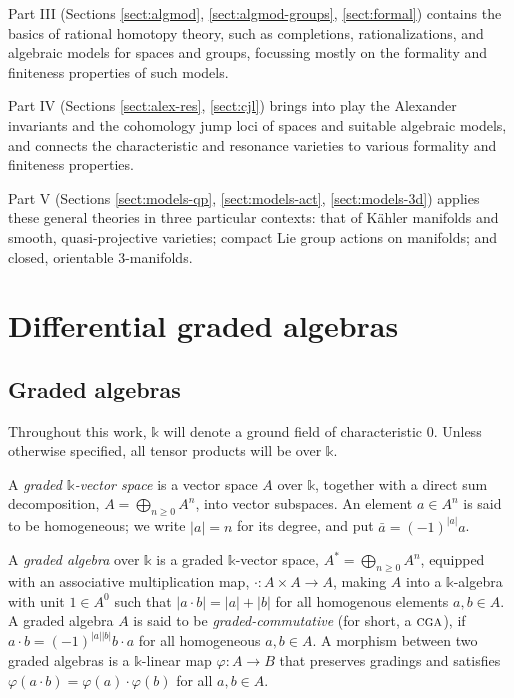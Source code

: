 \documentclass{article}
\numberwithin{equation}{section}
\theoremstyle{definition}
\renewcommand{\k}{\mathbb{k}}
\newcommand{\cga}{\ensuremath{\textsc{cga}}}
\newcommand{\abs}[1]{\left| #1 \right|}
\begin{document}
Part III (Sections \ref{sect:algmod}, \ref{sect:algmod-groups}, \ref{sect:formal}) 
contains the basics of rational homotopy theory, such as completions, 
rationalizations, and algebraic models for spaces and groups, focussing 
mostly on the formality and finiteness properties of such models.

Part IV (Sections \ref{sect:alex-res}, \ref{sect:cjl}) brings into play 
the Alexander invariants and the cohomology jump loci of spaces 
and suitable algebraic models, and connects the characteristic 
and resonance varieties to various formality and finiteness 
properties.

Part V (Sections \ref{sect:models-qp},  \ref{sect:models-act},  \ref{sect:models-3d}) 
applies these general theories in three particular contexts: that of K\"ahler manifolds 
and smooth, quasi-projective varieties; compact Lie group actions on manifolds; 
and closed, orientable $3$-manifolds. 

\section{Differential graded algebras}
\label{sect:dga}

\subsection{Graded algebras}
\label{subsec:graded-algebras}

Throughout this work, $\k$ will denote a ground field of characteristic $0$.
Unless otherwise specified, all tensor products will be over $\k$. 

A  {\em graded $\k$-vector space}\/ is a vector space $A$ over $\k$, 
together with a direct sum decomposition, $A=\bigoplus_{n\geq 0}A^n$,  
into vector subspaces. An element $a\in A^n$ is said 
to be homogeneous; we write $\abs{a}=n$ for its degree, 
and put $\bar{a}=(-1)^{\abs{a}}a$.

A {\em graded algebra}\/ over $\k$ is a graded $\k$-vector space, 
$A^{*}=\bigoplus_{n\geq 0}A^n$, equipped with an associative 
multiplication map, $\cdot \colon A\times A\to A$, making $A$ 
into a $\k$-algebra with unit $1\in A^0$ such that 
$\abs{a\cdot b}=\abs{a}+\abs{b}$ for all homogenous 
elements $a,b\in A$.  A graded algebra $A$ is said to be 
{\em graded-commutative}\/ (for short, a $\cga$), if 
$a\cdot b = (-1)^{\abs{a}\abs{b}} b \cdot a$ for all 
homogeneous $a,b\in A$. A morphism between two 
graded algebras is a $\k$-linear map $\varphi\colon A\to B$ 
that preserves gradings and satisfies $\varphi(a\cdot b)=\varphi(a)\cdot 
\varphi(b)$ for all $a,b\in A$.
\end{document}

